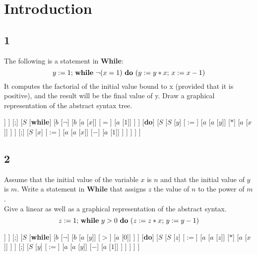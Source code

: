 \documentclass[spanish, a4paper, 12pt] {article}
\newcommand{\while}[0]{\textbf{While}}
\newcommand{\While}[0]{\textbf{While}}
\renewcommand{\while}[2]{\mbox{\textbf{while} } #1 \mbox{ \textbf{do} } #2}
\renewcommand{\=}[0]{:=}
\renewcommand{\;}[0]{\mbox{; }}
\newcommand{\eq}[0]{=}
\begin{document}
\section{Introduction}
\subsection{1}
The following is a statement in \While:
$$y \= 1\; \while{\neg(x=1)}{(y \= y*x \; x \= x-1)}$$
It computes the factorial of the initial value bound to x (provided that it is positive), and the result will be the final value of y. Draw a graphical representation of the abstract syntax tree.\\
\begin{forest}
[$S$
    [$S$
        [$y$]
        [$\=$]
        [$a$ [$1$]]
    ]
    [;]
    [$S$
        [\textbf{while}]
        [$b$
            [$\neg$]
            [$b$
                [$a$ [$x$]]
                [$\eq$]
                [$a$ [$1$]]
            ]
        ]
        [\textbf{do}]
        [$S$
            [$S$
                [$y$]
                [$\=$]
                [$a$
                    [$a$ [$y$]]
                    [$*$]
                    [$a$ [$x$]]
                ]
            ]
            [;]
            [$S$
                [$x$]
                [$\=$]
                [$a$
                    [$a$ [$x$]]
                    [$-$]
                    [$a$ [$1$]]
                ]
            ]
        ]
    ]
]
\end{forest}

\subsection{2}
Assume that the initial value of the variable $x$ is $n$ and that the initial value of $y$ is $m$. Write a statement in $\While$ that assigns $z$ the value of $n$ to the power of $m$.\\

Give a linear as well as a graphical representation of the abstract syntax.\\
$$z \= 1\; \while{y > 0}{(z \= z * x\; y \= y - 1)}$$
\begin{forest}
[$S$
    [$S$
        [$z$]
        [$\=$]
        [$a$ [$1$]]
    ]
    [;]
    [$S$
        [\textbf{while}]
        [$b$
            [$\neg$]
            [$b$
                [$a$ [$y$]]
                [$>$]
                [$a$ [$0$]]
            ]
        ]
        [\textbf{do}]
        [$S$
            [$S$
                [$z$]
                [$\=$]
                [$a$
                    [$a$ [$z$]]
                    [$*$]
                    [$a$ [$x$]]
                ]
            ]
            [;]
            [$S$
                [$y$]
                [$\=$]
                [$a$
                    [$a$ [$y$]]
                    [$-$]
                    [$a$ [$1$]]
                ]
            ]
        ]
    ]
]
\end{forest}
\end{document}
